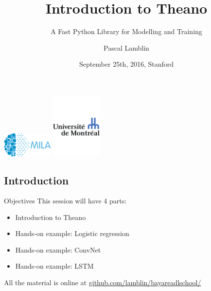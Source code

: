 \documentclass[a4paper,9pt]{beamer}
\title[Intro to Theano]{Introduction to Theano}
\subtitle{A Fast Python Library for Modelling and Training}
\author[MILA]{Pascal Lamblin}
\institute{%
Montreal Institute for Learning Algorithms (MILA)\\
Université de Montréal}
\date{%
September 25th, 2016, Stanford
}
\begin{document}
\begin{frame}[plain]
  \titlepage
  \includegraphics[width=1in]{MILA_official_2016.png}
  \hfill
  \includegraphics[width=1in]{UdeM_logo.pdf}
\end{frame}


\subsection*{Introduction}

\begin{frame}{Objectives}
  This session will have 4 parts:
  \begin{itemize}
    \item Introduction to Theano
    \item Hands-on example: Logistic regression
    \item Hands-on example: ConvNet
    \item Hands-on example: LSTM
  \end{itemize}
  All the material is online at
  \url{github.com/lamblin/bayareadlschool/}

\end{frame}
\end{document}
